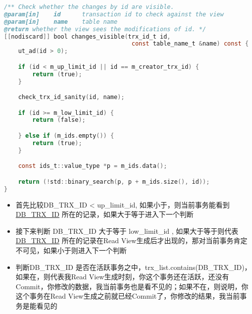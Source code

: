 \documentclass[../../../interview-questions.tex]{subfiles}
\begin{document}
\begin{lstlisting}[language=C]
/** Check whether the changes by id are visible.
@param[in]    id      transaction id to check against the view
@param[in]    name    table name
@return whether the view sees the modifications of id. */
[[nodiscard]] bool changes_visible(trx_id_t id,
                                    const table_name_t &name) const {
    ut_ad(id > 0);

    if (id < m_up_limit_id || id == m_creator_trx_id) {
        return (true);
    }

    check_trx_id_sanity(id, name);

    if (id >= m_low_limit_id) {
        return (false);

    } else if (m_ids.empty()) {
        return (true);
    }

    const ids_t::value_type *p = m_ids.data();

    return (!std::binary_search(p, p + m_ids.size(), id));
}
\end{lstlisting}

\begin{itemize}
    \item {首先比较DB\_TRX\_ID < up\_limit\_id, 如果小于，则当前事务能看到\url{DB\_TRX\_ID} 所在的记录，如果大于等于进入下一个判断}
    \item {接下来判断 DB\_TRX\_ID 大于等于 low\_limit\_id , 如果大于等于则代表\url{DB\_TRX\_ID} 所在的记录在Read View生成后才出现的，那对当前事务肯定不可见，如果小于则进入下一个判断 }
    \item {判断DB\_TRX\_ID 是否在活跃事务之中，trx\_list.contains(DB\_TRX\_ID)，如果在，则代表我Read View生成时刻，你这个事务还在活跃，还没有Commit，你修改的数据，我当前事务也是看不见的；如果不在，则说明，你这个事务在Read View生成之前就已经Commit了，你修改的结果，我当前事务是能看见的}
\end{itemize}
\end{document}
